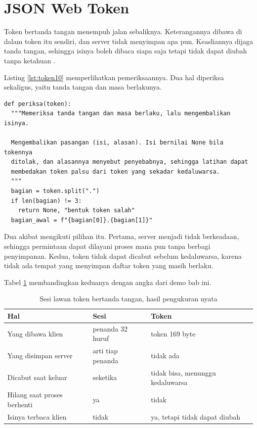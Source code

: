\section{JSON Web Token}

Token bertanda tangan menempuh jalan sebaliknya. Keterangannya dibawa di
dalam token itu sendiri, dan server tidak menyimpan apa pun. Keasliannya
dijaga tanda tangan, sehingga isinya boleh dibaca siapa saja tetapi tidak
dapat diubah tanpa ketahuan \cite{rfc7519}.

Listing \ref{lst:token10} memperlihatkan pemeriksaannya. Dua hal diperiksa
sekaligus, yaitu tanda tangan dan masa berlakunya.

\begin{lstlisting}[style=PythonStyle, caption={Memeriksa tanda tangan dan masa berlaku, tersedia di \berkas{sources/chapter10/token\_sederhana.py}}, label={lst:token10}]
def periksa(token):
  """Memeriksa tanda tangan dan masa berlaku, lalu mengembalikan isinya.

  Mengembalikan pasangan (isi, alasan). Isi bernilai None bila tokennya
  ditolak, dan alasannya menyebut penyebabnya, sehingga latihan dapat
  membedakan token palsu dari token yang sekadar kedaluwarsa.
  """
  bagian = token.split(".")
  if len(bagian) != 3:
    return None, "bentuk token salah"
  bagian_awal = f"{bagian[0]}.{bagian[1]}"
\end{lstlisting}

Dua akibat mengikuti pilihan itu. Pertama, server menjadi tidak berkeadaan,
sehingga permintaan dapat dilayani proses mana pun tanpa berbagi penyimpanan.
Kedua, token tidak dapat dicabut sebelum kedaluwarsa, karena tidak ada
tempat yang menyimpan daftar token yang masih berlaku.

Tabel \ref{tab:sesi-token} membandingkan keduanya dengan angka dari demo bab
ini.

\begin{table}[!htb]
  \centering
  \caption{Sesi lawan token bertanda tangan, hasil pengukuran nyata}
  \label{tab:sesi-token}
  \begin{tabularx}{\textwidth}{Xll}
    \hline
    \textbf{Hal} & \textbf{Sesi} & \textbf{Token} \\
    \hline
    Yang dibawa klien & penanda 32 huruf & token 169 byte \\
    \hline
    Yang disimpan server & arti tiap penanda & tidak ada \\
    \hline
    Dicabut saat keluar & seketika & tidak bisa, menunggu kedaluwarsa \\
    \hline
    Hilang saat proses berhenti & ya & tidak \\
    \hline
    Isinya terbaca klien & tidak & ya, tetapi tidak dapat diubah \\
    \hline
  \end{tabularx}
\end{table}

